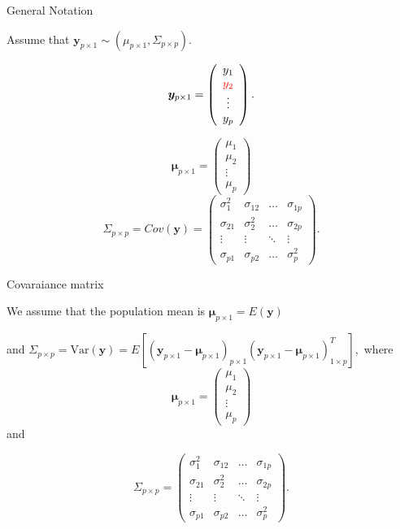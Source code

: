 \documentclass[ignorenonframetext,]{beamer}
\newcommand{\bmu}{\bm{\mu}}
\newcommand{\sig}   {\Sigma}
\newcommand{\var}{\text{Var}}
\begin{document}
\begin{frame}{General Notation}

Assume that
\(\bm{y}_{p \times 1} \sim (\mu_{p \times 1}, \Sigma_{p \times p}).\)

\[\bm{y}_{p \times 1}= \left( \begin{array}{c}
y_{1}\\
\textcolor{red}{y_{2}}\\
\vdots\\
y_{p}
\end{array} \right).\]

\[\bmu_{p \times 1}= \left( \begin{array}{c}
\mu_1\\
\mu_2\\
\vdots\\
\mu_p
\end{array} \right)
\] \[
\sig_{p \times p} = Cov(\bm{y}) =
\left( \begin{array}{cccc}
\sigma_1^2 & \sigma_{12} & \ldots&  \sigma_{1p}\\
\sigma_{21} & \sigma_2^2 & \ldots& \sigma_{2p}\\
\vdots & \vdots & \ddots & \vdots \\
\sigma_{p1} & \sigma_{p2} &\ldots& \sigma_p^2
\end{array} \right).
\]

\end{frame}

\begin{frame}{Covaraiance matrix}

We assume that the population mean is \(\bmu_{p \times 1} = E(\bm{y})\)

and
\(\Sigma_{p \times p} = \var(\bm{y}) = E[(\bm{y}_{p\times1} - \bmu_{p \times 1})_{p\times1}(\bm{y}_{p\times1} - \bmu_{p \times 1})^T_{1\times p}],\)
where \[  \bmu_{p \times 1}= \left( \begin{array}{c}
\mu_1\\
\mu_2\\
\vdots\\
\mu_p
\end{array} \right) \] and

\[\sig_{p \times p} = 
\left( \begin{array}{cccc}
\sigma_1^2 & \sigma_{12} & \ldots&  \sigma_{1p}\\
\sigma_{21} & \sigma_2^2 & \ldots& \sigma_{2p}\\
\vdots & \vdots & \ddots & \vdots \\
\sigma_{p1} & \sigma_{p2} &\ldots& \sigma_p^2
\end{array} \right).
\]

\end{frame}
\end{document}
